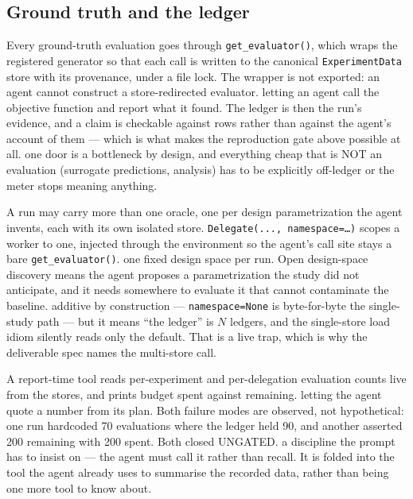 \subsection{Ground truth and the ledger}
\label{sec:oracle}

{Every ground-truth evaluation goes through \texttt{get\_evaluator()}, which
wraps the registered generator so that each call is written to the canonical
\texttt{ExperimentData} store with its provenance, under a file lock. The
wrapper is not exported: an agent cannot construct a store-redirected
evaluator.}
{letting an agent call the objective function and report what it found. The
ledger is then the run's evidence, and a claim is checkable against rows rather
than against the agent's account of them --- which is what makes the
reproduction gate above possible at all.}
{one door is a bottleneck by design, and everything cheap that is NOT an
evaluation (surrogate predictions, analysis) has to be explicitly off-ledger or
the meter stops meaning anything.}

{A run may carry more than one oracle, one per design parametrization the agent
invents, each with its own isolated store. \texttt{Delegate(..., namespace=…)}
scopes a worker to one, injected through the environment so the agent's call
site stays a bare \texttt{get\_evaluator()}.}
{one fixed design space per run. Open design-space discovery means the agent
proposes a parametrization the study did not anticipate, and it needs somewhere
to evaluate it that cannot contaminate the baseline.}
{additive by construction --- \texttt{namespace=None} is byte-for-byte the
single-study path --- but it means ``the ledger'' is $N$ ledgers, and the
single-store load idiom silently reads only the default. That is a live trap,
which is why the deliverable spec names the multi-store call.}

{A report-time tool reads per-experiment and per-delegation evaluation counts
live from the stores, and prints budget spent against remaining.}
{letting the agent quote a number from its plan. Both failure modes are
observed, not hypothetical: one run hardcoded 70 evaluations where the ledger
held 90, and another asserted 200 remaining with 200 spent. Both closed
UNGATED.}
{a discipline the prompt has to insist on --- the agent must call it rather
than recall. It is folded into the tool the agent already uses to summarise the
recorded data, rather than being one more tool to know about.}

